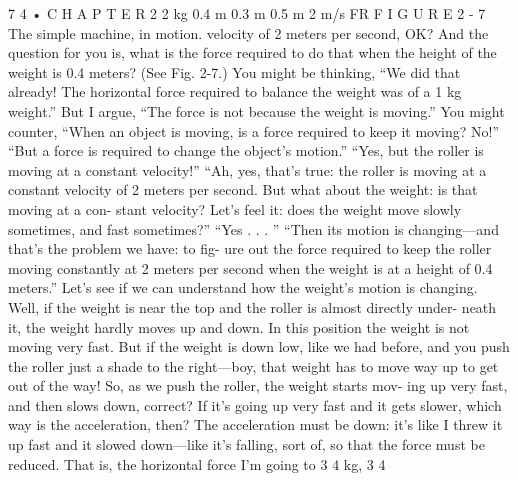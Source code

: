 \documentclass[10pt,oneside]{article}
\begin{document}
7 4 • C H A P T E R  2 2 kg 0.4 m 0.3 m 0.5 m 2 m/s FR F I G U R E  2 - 7 The simple machine, in motion. velocity of 2 meters per second, OK? And the question for you is, what is the force required to do that when the height of the weight is 0.4 meters? (See Fig. 2-7.) You might be thinking, “We did that already! The horizontal force required to balance the weight was of a 1 kg weight.” But I argue, “The force is not because the weight is moving.” You might counter, “When an object is moving, is a force required to keep it moving? No!” “But a force is required to change the object’s motion.” “Yes, but the roller is moving at a constant velocity!” “Ah, yes, that’s true: the roller is moving at a constant velocity of 2 meters per second. But what about the weight: is that moving at a con- stant velocity? Let’s feel it: does the weight move slowly sometimes, and fast sometimes?” “Yes . . . ” “Then its motion is changing---and that’s the problem we have: to fig- ure out the force required to keep the roller moving constantly at 2 meters per second when the weight is at a height of 0.4 meters.” Let’s see if we can understand how the weight’s motion is changing. Well, if the weight is near the top and the roller is almost directly under- neath it, the weight hardly moves up and down. In this position the weight is not moving very fast. But if the weight is down low, like we had before, and you push the roller just a shade to the right---boy, that weight has to move way up to get out of the way! So, as we push the roller, the weight starts mov- ing up very fast, and then slows down, correct? If it’s going up very fast and it gets slower, which way is the acceleration, then? The acceleration must be down: it’s like I threw it up fast and it slowed down---like it’s falling, sort of, so that the force must be reduced. That is, the horizontal force I’m going to 3 4 kg, 3 4\par
\end{document}

